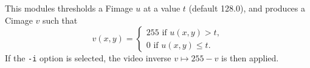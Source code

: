 This modules thresholds a Fimage $u$ at a value $t$ (default 128.0), and
produces a Cimage $v$ such that 
$$v(x,y) = \left\{ \begin{array}{l}
255 \mbox{ if } u(x,y) > t,\\
0 \mbox{ if } u(x,y) \leq t.
\end{array}\right.$$
If the \verb+-i+ option is selected, the video inverse 
$v\mapsto 255-v$ is then applied.
